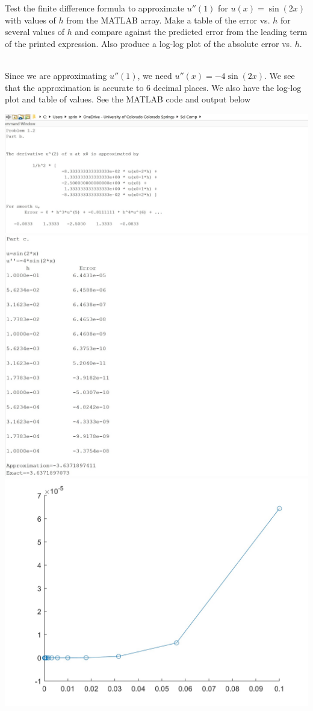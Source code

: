 Test the finite difference formula to approximate $u''(1)$ for $u(x)=\sin(2x)$ with values of $h$ from
the MATLAB array. Make a table of the error vs. $h$ for several values of $h$ and compare against the
predicted error from the leading term of the printed expression. Also produce a log-log plot of the
absolute error vs. $h$.\\

\begin{solution}\renewcommand{\qedsymbol}{}\ \\
    Since we are approximating $u''(1)$, we need $u''(x)=-4\sin(2x)$. We see that the approximation is
    accurate to 6 decimal places. We also have the log-log plot and table of values. See the MATLAB code
    and output below

    \includegraphics[scale=0.75]{2b.jpg}
    \includegraphics[scale=1]{2c.jpg}
    \includegraphics[scale=0.3]{loglog.jpg}


\end{solution}

